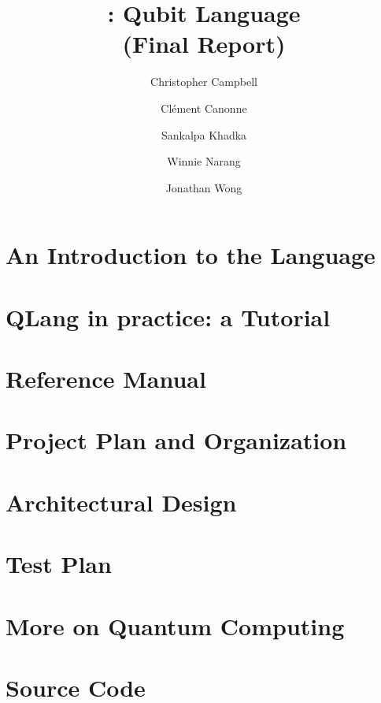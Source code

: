 \documentclass[11pt]{report}
\title{\QL: Qubit Language\\ \Large(Final Report)}
\author{
  Christopher Campbell
  \and Cl\'ement Canonne
  \and Sankalpa Khadka
  \and Winnie Narang
  \and Jonathan Wong
}
\newcommand{\QL}{\textsf{QLang}\xspace}
\begin{document}
\maketitle
\tableofcontents

\chapter{An Introduction to the Language}
  
\chapter{\QL in practice: a Tutorial}
  
\chapter{Reference Manual}
\chapter{Project Plan and Organization}
\chapter{Architectural Design}
\chapter{Test Plan}
\appendix
\chapter{More on Quantum Computing}\label{app:quantum:more}
  
\chapter{Source Code}
\end{document}
